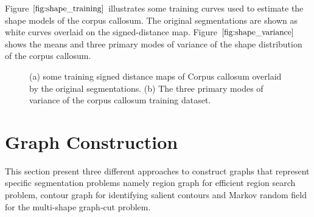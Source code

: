 \documentclass{SMBV12}
\begin{document}
Figure $\ref{fig:shape_training}$ illustrates some training curves used to estimate the shape models of the corpus callosum. The original segmentations are shown as white curves overlaid on the signed-distance map. Figure $\ref{fig:shape_variance}$ shows the means and three primary modes of variance of the shape distribution of the corpus callosum.

\begin{figure}[htbp]
    \centering
    \caption{(a) some training signed distance maps of Corpus callosum overlaid by the original segmentations. (b) The three primary modes of variance of the corpus callosum training dataset.}
\end{figure}

\section{Graph Construction}
\label{sec:graph_cunstruction}
This section present three different approaches to construct graphs that represent specific segmentation problems namely region graph for efficient region search problem, contour graph for identifying salient contours and Markov random field for the multi-shape graph-cut problem.
\end{document}
